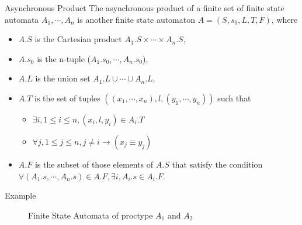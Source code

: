 \documentclass[12pt]{beamer}
\begin{document}
\begin{frame}{Asynchronous Product}
	The asynchronous product of a finite set of finite state automata $A_{1}, \cdots, A_{n}$ is another finite state automaton $A = (S, s_{0}, L, T, F)$, where 
\begin{itemize}
	\item $A.S$ is the Cartesian product $A_{1}.S\times \cdots \times A_{n}.S$,
	\item $A.s_{0}$ is the n-tuple ($A_{1}.s_{0}, \cdots , A_{n}.s_{0}$),
	\item $A.L$ is the union set $A_{1}.L \cup \cdots \cup A_{n}.L$,
	\item $A.T$ is the set of tuples $((x_{1}, \cdots, x_{n}), l, (y_{1}, \cdots, y_{n}))$ such that 
	\begin{itemize}
		\item $\exists i, 1 \leq i \leq n, (x_{i}, l, y_{i})\in A_{i}.T$
		\item $\forall j, 1 \leq j \leq n, j \neq i \rightarrow (x_{j} \equiv y_{j})$
	\end{itemize}
	\item $A.F$ is the subset of those elements of $A.S$ that satisfy the condition $\forall(A_{1}.s, \cdots, A_{n}.s)\in A.F, \exists i, A_{i}.s \in A_{i}.F$.
\end{itemize}
\end{frame}


\begin{frame}{Example}
	\begin{figure}[ht] %
	\centering %
		\caption{Finite State Automata of proctype $A_{1}$ and $A_{2}$}
	\end{figure}
\end{frame}
\end{document}
